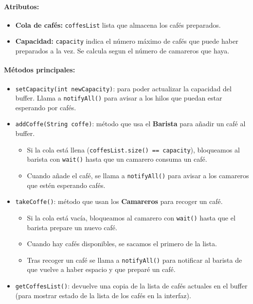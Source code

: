 \documentclass[a4paper,12pt]{report}
\begin{document}
\paragraph{Atributos:}
\begin{itemize}
  \item \textbf{Cola de cafés:} \texttt{coffesList} lista que almacena los cafés preparados.
  \item \textbf{Capacidad:} \texttt{capacity} indica el número máximo de cafés que puede haber preparados a la vez. Se calcula segun el número de camareros que haya.
\end{itemize}

\paragraph{Métodos principales:}
\begin{itemize}
  \item \texttt{setCapacity(int newCapacity)}: para poder actualizar la capacidad del buffer. Llama a \texttt{notifyAll()} para avisar a los hilos que puedan estar esperando por cafés.
  \item \texttt{addCoffe(String coffe)}: método que usa el \textbf{Barista} para añadir un café al buffer.
  \begin{itemize}
      \item Si la cola está llena (\texttt{coffesList.size() == capacity}), bloqueamos al barista con \texttt{wait()} hasta que un camarero consuma un café.
      \item Cuando añade el café, se llama a \texttt{notifyAll()} para avisar a los camareros que estén esperando cafés.
  \end{itemize}
  \item \texttt{takeCoffe()}: método que usan los \textbf{Camareros} para recoger un café.
  \begin{itemize}
      \item Si la cola está vacía, bloqueamos al camarero con \texttt{wait()} hasta que el barista prepare un nuevo café.
      \item Cuando hay cafés disponibles, se sacamos el primero de la lista.
      \item Tras recoger un café se llama a \texttt{notifyAll()} para notificar al barista de que vuelve a haber espacio y que preparé un café.
  \end{itemize}
  \item \texttt{getCoffesList()}: devuelve una copia de la lista de cafés actuales en el buffer (para mostrar estado de la lista de los cafés en la interfaz).
\end{itemize}
\end{document}
